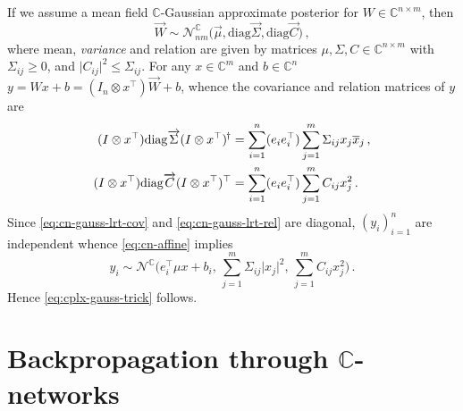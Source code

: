 \documentclass[a4paper,10pt,onecolumn]{article}
\newcommand{\cplx}{\mathbb{C}}
\newcommand{\hop}{{\mkern-1.5mu\dagger}}
\newcommand{\conj}[1]{\overline{#1}}
\renewcommand{\vec}[1]{\overrightarrow{#1}}
\newcommand{\diag}[1]{\mathrm{diag}{#1}}
\begin{document}
If we assume a mean field $\cplx$-Gaussian approximate posterior for $
  W \in \cplx^{n\times m}
$, then
\begin{equation}  \label{eq:c-gauss-vi-general-vec}
  \vec{W}
    \sim \mathcal{N}^{\cplx}_{nm} \bigl(
      \vec{\mu}, \diag{\vec{\Sigma}}, \diag{\vec{C}}
    \bigr)
  \,,
\end{equation}
where mean, \textit{variance} and relation are given by matrices $
  \mu, \Sigma, C \in \cplx^{n\times m}
$ with $\Sigma_{ij} \geq 0$, and $
  \lvert C_{ij} \rvert^2 \leq \Sigma_{ij}
$. For any $x \in \cplx^m$ and $b\in \cplx^n$ $
  y = W x + b
    = (I_n \otimes x^\top) \vec{W} + b
$, whence the covariance and relation matrices of $y$ are
\begin{align}
  (I \otimes x^\top) \diag{\vec{\Sigma}} (I \otimes x^\top)^{\hop}
    & = \sum_{i=1}^n (e_i e_i^\top) \sum_{j=1}^m \Sigma_{ij} x_j \conj{x}_j
    \,,  \label{eq:cn-gauss-lrt-cov} \\
  (I \otimes x^\top) \diag{\vec{C}} (I \otimes x^\top)^\top
    & = \sum_{i=1}^n (e_i e_i^\top) \sum_{j=1}^m C_{ij} x_j^2
    \,.  \label{eq:cn-gauss-lrt-rel}
\end{align}
Since \eqref{eq:cn-gauss-lrt-cov} and \eqref{eq:cn-gauss-lrt-rel} are diagonal, $(y_i)_{i=1}^n$
are independent whence \eqref{eq:cn-affine} implies
\begin{equation}  \label{eq:cplx-gauss-trick-appendix}
  y_i
    \sim \mathcal{N}^{\cplx}
      \bigl(
        e_i^\top \mu x + b_i,
        \, \sum_{j=1}^m \Sigma_{ij} \lvert x_j \rvert^2,
        \, \sum_{j=1}^m C_{ij} x_j^2
      \bigr)
    \,.
\end{equation}
Hence \eqref{eq:cplx-gauss-trick} follows.


\section{Backpropagation through $\cplx$-networks} %
\label{sub:wirtinger_calculus}
\end{document}

